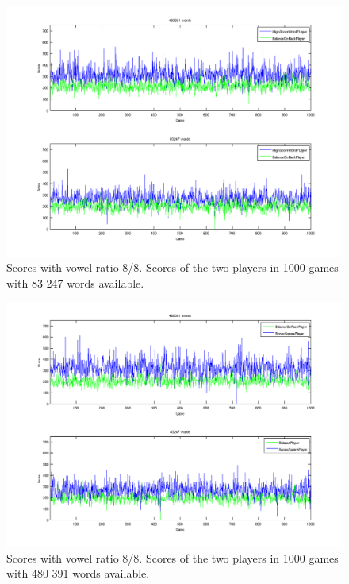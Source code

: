 \documentclass[a4paper, 12pt]{report}
\begin{document}
\begin{figure}[h]
\centering
\includegraphics[scale=0.5]{HighBalance8vow_bothDict}
\caption {Scores with vowel ratio 8/8. Scores of the two players in 1000 games with 83 247 words available.}
\label{fig:largeDict}
\end{figure}

\begin{figure}[h]
\centering
\includegraphics[scale=0.5]{BonusBalance8vow_bothDict}
\caption {Scores with vowel ratio 8/8. Scores of the two players in 1000 games with 480 391 words available.}
\label{fig:bonusBalanceLargeDict}
\end{figure}
\end{document}

